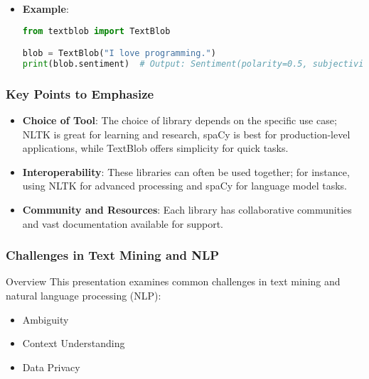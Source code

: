 \documentclass[aspectratio=169]{beamer}
\begin{document}
\begin{frame}[fragile]
\begin{itemize}
\begin{itemize}
            \item \textbf{Example}:
            \begin{lstlisting}[language=Python]
from textblob import TextBlob

blob = TextBlob("I love programming.")
print(blob.sentiment)  # Output: Sentiment(polarity=0.5, subjectivity=0.6)
            \end{lstlisting}
        \end{itemize}
    \end{itemize}
\end{frame}

\begin{frame}
    \frametitle{Key Points to Emphasize}
    \begin{itemize}
        \item \textbf{Choice of Tool}: The choice of library depends on the specific use case; 
        NLTK is great for learning and research, spaCy is best for production-level applications, 
        while TextBlob offers simplicity for quick tasks.
        
        \item \textbf{Interoperability}: These libraries can often be used together; for instance, using 
        NLTK for advanced processing and spaCy for language model tasks.
        
        \item \textbf{Community and Resources}: Each library has collaborative communities and vast documentation available for support.
    \end{itemize}
\end{frame}

\begin{frame}[fragile]
    \frametitle{Challenges in Text Mining and NLP}
    \begin{block}{Overview}
        This presentation examines common challenges in text mining and natural language processing (NLP):
        \begin{itemize}
            \item Ambiguity
            \item Context Understanding
            \item Data Privacy
        \end{itemize}
    \end{block}
\end{frame}
\end{document}
